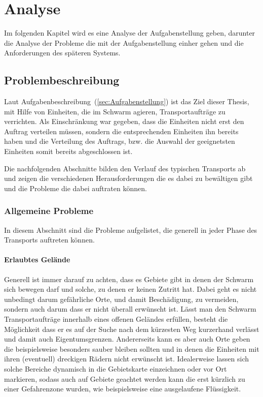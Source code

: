 \chapter{Analyse}\label{ch:Analyse}
Im folgenden Kapitel wird es eine Analyse der Aufgabenstellung geben, darunter die Analyse der Probleme die mit der Aufgabenstellung einher gehen und die Anforderungen des späteren Systems.\\

\section{Problembeschreibung}\label{sec:Problembeschreibung}
Laut Aufgabenbeschreibung~(\autoref{sec:Aufgabenstellung}) ist das Ziel dieser Thesis, mit Hilfe von Einheiten, die im Schwarm agieren, Transportaufträge zu verrichten.
Als Einschränkung war gegeben, dass die Einheiten nicht erst den Auftrag verteilen müssen, sondern die entsprechenden Einheiten ihn bereits haben und die Verteilung des Auftrags, bzw. die Auswahl der geeignetsten Einheiten somit bereits abgeschlossen ist.

Die nachfolgenden Abschnitte bilden den Verlauf des typischen Transports ab und zeigen die verschiedenen Herausforderungen die es dabei zu bewältigen gibt und die Probleme die dabei auftraten können.

\subsection*{Allgemeine Probleme}\label{subsec:AllgemeineProbleme}
In diesem Abschnitt sind die Probleme aufgelistet, die generell in jeder Phase des Transports auftreten können.

\subsubsection*{Erlaubtes Gelände}
Generell ist immer darauf zu achten, dass es Gebiete gibt in denen der Schwarm sich bewegen darf und solche, zu denen er keinen Zutritt hat.
Dabei geht es nicht unbedingt darum gefährliche Orte, und damit Beschädigung, zu vermeiden, sondern auch darum dass er nicht überall erwünscht ist.
Lässt man den Schwarm Transportaufträge innerhalb eines offenen Geländes erfüllen, besteht die Möglichkeit dass er es auf der Suche nach dem kürzesten Weg kurzerhand verlässt und damit auch Eigentumsgrenzen.
Andererseits kann es aber auch Orte geben die beispielsweise besonders sauber bleiben sollten und in denen die Einheiten mit ihren (eventuell) dreckigen Rädern nicht erwünscht ist.
Idealerweise lassen sich solche Bereiche dynamisch in die Gebietskarte einzeichnen oder vor Ort markieren, sodass auch auf Gebiete geachtet werden kann die erst kürzlich zu einer Gefahrenzone wurden, wie beispielsweise eine ausgelaufene Flüssigkeit.

